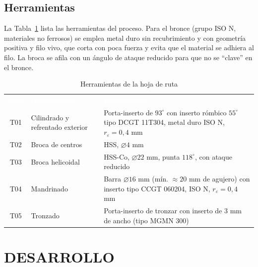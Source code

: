 \documentclass[12pt,a4paper]{article}
\newcommand{\encab}[1]{\textcolor{white}{\sffamily\bfseries #1}}
\begin{document}
\subsection{Herramientas}

La Tabla~\ref{tab:herramientas} lista las herramientas del proceso. Para el
bronce (grupo ISO N, materiales no ferrosos) se emplea metal duro sin
recubrimiento y con geometría positiva y filo vivo, que corta con poca fuerza y
evita que el material se adhiera al filo. La broca se afila con un ángulo de
ataque reducido para que no se ``clave'' en el bronce.

\begin{table}[!htb]
	\centering
	\caption{Herramientas de la hoja de ruta}\label{tab:herramientas}
	\small
	\begin{tabularx}{\linewidth}{c l X}
		\rowcolor{darkblue}
		\encab{Cód.} & \encab{Herramienta}              & \encab{Descripción}                                                                                                       \\
		T01          & Cilindrado y refrentado exterior & Porta-inserto de $93^\circ$ con inserto rómbico $55^\circ$ tipo DCGT 11T304, metal duro ISO N, $r_\varepsilon=0{,}4$ mm   \\
		T02          & Broca de centros                 & HSS, $\varnothing 4$ mm                                                                                                   \\
		T03          & Broca helicoidal                 & HSS-Co, $\varnothing 22$ mm, punta $118^\circ$, con ataque reducido                                                       \\
		T04          & Mandrinado                       & Barra $\varnothing 16$ mm (mín. $\approx 20$ mm de agujero) con inserto tipo CCGT 060204, ISO N, $r_\varepsilon=0{,}4$ mm \\
		T05          & Tronzado                         & Porta-inserto de tronzar con inserto de 3 mm de ancho (tipo MGMN 300)                                                     \\
	\end{tabularx}
\end{table}

\newpage

\section{DESARROLLO}
\end{document}
